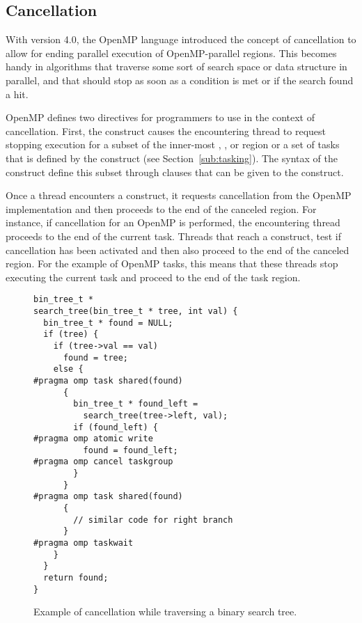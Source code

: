 \subsection{Cancellation}
\label{sec:Cancellation}
With version 4.0, the OpenMP language introduced the concept of cancellation to allow for ending parallel execution of OpenMP-parallel regions.
This becomes handy in algorithms that traverse some sort of search space or data structure in parallel, and that should stop as soon as a condition is met or if the search found a hit.

OpenMP defines two directives for programmers to use in the context of cancellation.
First, the  construct causes the encountering thread to request stopping execution for a subset of the inner-most , ,  or  region or a set of tasks that is defined by the  construct (see Section~\ref{sub:tasking}).  
The syntax of the  construct define this subset through clauses that can be given to the construct.

Once a thread encounters a  construct, it requests cancellation from the OpenMP implementation and then proceeds to the end of the canceled region.
For instance, if cancellation for an OpenMP  is performed, the encountering thread proceeds to the end of the current task.
Threads that reach a  construct, test if cancellation has been activated and then also proceed to the end of the canceled region.
For the example of OpenMP tasks, this means that these threads stop executing the current task and proceed to the end of the task region.

\begin{figure}
\begin{verbatim}
bin_tree_t *
search_tree(bin_tree_t * tree, int val) {
  bin_tree_t * found = NULL;
  if (tree) {
    if (tree->val == val)
      found = tree;
    else {
#pragma omp task shared(found)
      {
        bin_tree_t * found_left =
          search_tree(tree->left, val);
        if (found_left) {
#pragma omp atomic write
          found = found_left;
#pragma omp cancel taskgroup
        }
      }
#pragma omp task shared(found)
      {
        // similar code for right branch
      }
#pragma omp taskwait
    }
  }
  return found;
}
\end{verbatim}
\caption{Example of cancellation while traversing a binary search tree.\label{fig:Cancellation}}
\end{figure}

